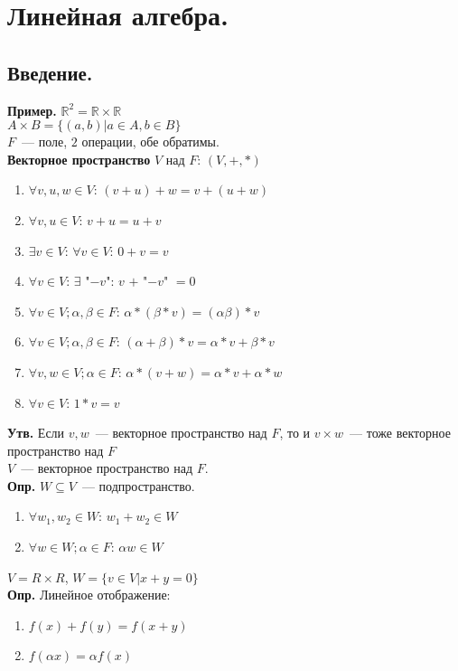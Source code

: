 \documentclass{article}
\begin{document}
	\tableofcontents
	\setcounter{tocdepth}{3}
	\newpage
	\section{Линейная алгебра.}
	\subsection{Введение.}
	\textbf{Пример.} $\mathbb{R}^2 = \mathbb{R} \times \mathbb{R}$ \\
	$A \times B = \{ (a, b) | a \in A, b \in B \}$ \\
	$F$~--- поле, $2$ операции, обе обратимы. \\
	\textbf{Векторное пространство} $V$ над $F$: $(V, +, *)$
	\begin{enumerate}
		\item $\forall v, u, w \in V$: $(v + u) + w = v + (u + w)$
		\item $\forall v, u \in V$: $v + u = u + v$
		\item $\exists v \in V$: $\forall v \in V$: $0 + v = v$
		\item $\forall v \in V$: $\exists$ "$-v$": $v$ $+$ "$-v$" $= 0$
		\item $\forall v \in V; \alpha, \beta \in F$: $\alpha * (\beta * v) = (\alpha \beta) * v$
		\item $\forall v \in V; \alpha, \beta \in F$: $(\alpha + \beta) * v = \alpha * v + \beta * v$
		\item $\forall v, w \in V; \alpha \in F$: $\alpha * (v + w) = \alpha * v + \alpha * w$
		\item $\forall v \in V$: $1 * v = v$
	\end{enumerate}
	\textbf{Утв.} Если $v, w$~--- векторное пространство над $F$, то и $v \times w$~--- тоже векторное пространство над $F$ \\
	$V$~--- векторное пространство над $F$. \\
	\textbf{Опр.} $W \subseteq V$~--- подпространство.
	\begin{enumerate}
		\item $\forall w_1, w_2 \in W$: $w_1 + w_2 \in W$
		\item $\forall w \in W; \alpha \in F$: $\alpha w \in W$
	\end{enumerate}
	$V = R \times R$, $W = \{ v \in V | x + y = 0 \}$ \\
	\textbf{Опр.} Линейное отображение:
	\begin{enumerate}
		\item $f(x) + f(y) = f(x + y)$
		\item $f(\alpha x) = \alpha f(x)$
	\end{enumerate}
\end{document}
